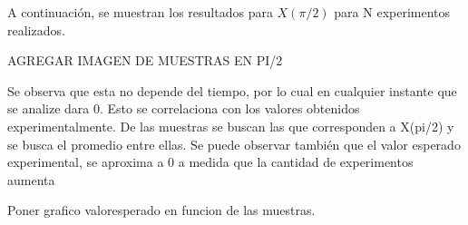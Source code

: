 A continuación, se muestran los resultados para $X(\pi/2)$ para N experimentos realizados.

AGREGAR IMAGEN DE MUESTRAS EN PI/2




Se observa que esta no depende del tiempo, por lo cual en cualquier instante que se analize dara 0. Esto se correlaciona con los valores obtenidos experimentalmente. De las muestras se buscan las que corresponden a X(pi/2) y se busca el promedio entre ellas. Se puede observar también que el valor esperado experimental, se aproxima a 0 a medida que la cantidad de experimentos aumenta

Poner grafico valoresperado en funcion de las muestras.



